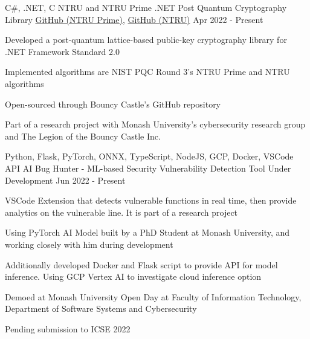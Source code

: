 




\begin{cventries}

  \cventry
  {C\#, .NET, C}
  {NTRU and NTRU Prime .NET Post Quantum Cryptography Library}
  {\href{https://github.com/bcgit/bc-csharp/tree/master/crypto/src/pqc/crypto/ntruprime}{GitHub (NTRU Prime)}, \href{https://github.com/bcgit/bc-csharp/tree/master/crypto/src/pqc/crypto/ntru}{GitHub (NTRU)}} %
  {Apr 2022 - Present}
  {
    \begin{cvitems}
      \item {Developed a post-quantum lattice-based public-key cryptography library for .NET Framework Standard 2.0}
      \item {Implemented algorithms are NIST PQC Round 3's NTRU Prime and NTRU algorithms}
      \item {Open-sourced through Bouncy Castle's GitHub repository}
      \item {Part of a research project with Monash University's cybersecurity research group and The Legion of the Bouncy Castle Inc.}
    \end{cvitems}
  }

  \cventry
  {Python, Flask, PyTorch, ONNX, TypeScript, NodeJS, GCP, Docker, VSCode API}
  {AI Bug Hunter - ML-based Security Vulnerability Detection Tool}
  {Under Development} %
  {Jun 2022 - Present}
  {
    \begin{cvitems}
      \item {VSCode Extension that detects vulnerable functions in real time, then provide analytics on the vulnerable line. It is part of a research project}
      \item {Using PyTorch AI Model built by a PhD Student at Monash University, and working closely with him during development}
      \item {Additionally developed Docker and Flask script to provide API for model inference. Using GCP Vertex AI to investigate cloud inference option}
      \item {Demoed at Monash University Open Day at Faculty of Information Technology, Department of Software Systems and Cybersecurity}
      \item {Pending submission to ICSE 2022}
    \end{cvitems}
  }


\end{cventries}
